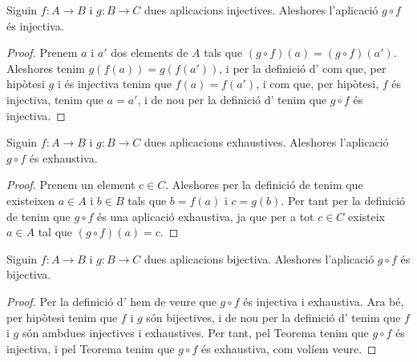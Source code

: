 \documentclass[../Apunts.tex]{subfiles}
\begin{document}
	\begin{theorem}
		\label{thm:composició d'injectives injectiva}
		Siguin \(f\colon A\rightarrow B\) i \(g\colon B\rightarrow C\) dues aplicacions injectives. Aleshores l'aplicació \(g\circ f\) és injectiva.
		\begin{proof}
			Prenem \(a\) i \(a'\) dos elements de \(A\) tals que \((g\circ f)(a)=(g\circ f)(a')\). Aleshores tenim \(g(f(a))=g(f(a'))\), i per la definició d' com que, per hipòtesi \(g\) i és injectiva tenim que \(f(a)=f(a')\), i com que, per hipòtesi, \(f\) és injectiva, tenim que \(a=a'\), i de nou per la definició d' tenim que \(g\circ f\) és injectiva.
		\end{proof}
	\end{theorem}
	\begin{theorem}
		\label{thm:composició d'exhaustives exhaustiva}
		Siguin \(f\colon A\rightarrow B\) i \(g\colon B\rightarrow C\) dues aplicacions exhaustives. Aleshores l'aplicació \(g\circ f\) és exhaustiva.
		\begin{proof}
			Prenem un element \(c\in C\). Aleshores per la definició de  tenim que existeixen \(a\in A\) i \(b\in B\) tals que \(b=f(a)\) i \(c=g(b)\). Per tant per la definició de  tenim que \(g\circ f\) és una aplicació exhaustiva, ja que per a tot \(c\in C\) existeix \(a\in A\) tal que \((g\circ f)(a)=c\).
		\end{proof}
	\end{theorem}
	\begin{theorem}
		\label{thm:composició de bijectives bijectiva}
		\label{thm:conjugació de bijectives bijectiva}
		Siguin \(f\colon A\rightarrow B\) i \(g\colon B\rightarrow C\) dues aplicacions bijectiva. Aleshores l'aplicació \(g\circ f\) és bijectiva.
		\begin{proof}
			Per la definició d' hem de veure que \(g\circ f\) és injectiva i exhaustiva. Ara bé, per hipòtesi tenim que \(f\) i \(g\) són bijectives, i de nou per la definició d' tenim que \(f\) i \(g\) són ambdues injectives i exhaustives. Per tant, pel Teorema  tenim que \(g\circ f\) és injectiva, i pel Teorema  tenim que \(g\circ f\) és exhaustiva, com volíem veure.
		\end{proof}
	\end{theorem}
\end{document}
